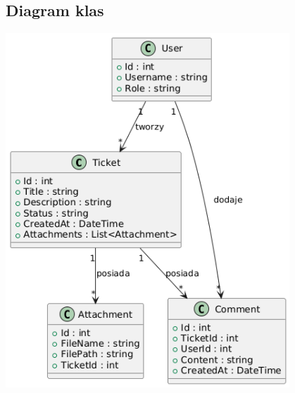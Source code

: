 \documentclass[a4paper,12pt]{article}
\begin{document}
\subsection{Diagram klas}
\begin{center}
\includegraphics[width=0.8\textwidth]{draw/diagramClass.png}
\end{center}
\end{document}
